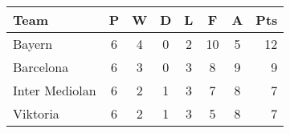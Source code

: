 \begin{tabular}{l*{6}{c}r}
Team              & P & W & D & L & F  & A & Pts \\
\hline
Bayern & 6 & 4 & 0 & 2 & 10 & 5 & 12  \\
Barcelona           & 6 & 3 & 0 & 3 &  8 & 9 &  9  \\
Inter Mediolan           & 6 & 2 & 1 & 3 &  7 & 8 &  7  \\
Viktoria & 6 & 2 & 1 & 3 &  5 & 8 &  7  \\
\end{tabular}